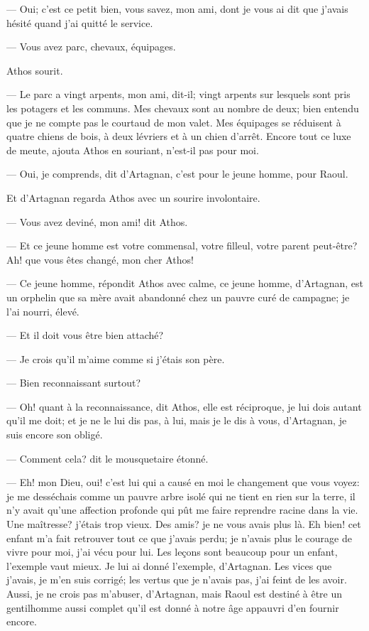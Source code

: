 — Oui; c'est ce petit bien, vous savez, mon ami, dont je vous ai dit que j'avais hésité quand j'ai quitté le service.

— Vous avez parc, chevaux, équipages.

Athos sourit.

— Le parc a vingt arpents, mon ami, dit-il; vingt arpents sur lesquels sont pris les potagers et les communs. Mes chevaux sont au nombre de deux; bien entendu que je ne compte pas le courtaud de mon valet. Mes équipages se réduisent à quatre chiens de bois, à deux lévriers et à un chien d'arrêt. Encore tout ce luxe de meute, ajouta Athos en souriant, n'est-il pas pour moi.

— Oui, je comprends, dit d'Artagnan, c'est pour le jeune homme, pour Raoul.

Et d'Artagnan regarda Athos avec un sourire involontaire.

— Vous avez deviné, mon ami! dit Athos.

— Et ce jeune homme est votre commensal, votre filleul, votre parent peut-être? Ah! que vous êtes changé, mon cher Athos!

— Ce jeune homme, répondit Athos avec calme, ce jeune homme, d'Artagnan, est un orphelin que sa mère avait abandonné chez un pauvre curé de campagne; je l'ai nourri, élevé.

— Et il doit vous être bien attaché?

— Je crois qu'il m'aime comme si j'étais son père.

— Bien reconnaissant surtout?

— Oh! quant à la reconnaissance, dit Athos, elle est réciproque, je lui dois autant qu'il me doit; et je ne le lui dis pas, à lui, mais je le dis à vous, d'Artagnan, je suis encore son obligé.

— Comment cela? dit le mousquetaire étonné.

— Eh! mon Dieu, oui! c'est lui qui a causé en moi le changement que vous voyez: je me desséchais comme un pauvre arbre isolé qui ne tient en rien sur la terre, il n'y avait qu'une affection profonde qui pût me faire reprendre racine dans la vie. Une maîtresse? j'étais trop vieux. Des amis? je ne vous avais plus là. Eh bien! cet enfant m'a fait retrouver tout ce que j'avais perdu; je n'avais plus le courage de vivre pour moi, j'ai vécu pour lui. Les leçons sont beaucoup pour un enfant, l'exemple vaut mieux. Je lui ai donné l'exemple, d'Artagnan. Les vices que j'avais, je m'en suis corrigé; les vertus que je n'avais pas, j'ai feint de les avoir. Aussi, je ne crois pas m'abuser, d'Artagnan, mais Raoul est destiné à être un gentilhomme aussi complet qu'il est donné à notre âge appauvri d'en fournir encore.


